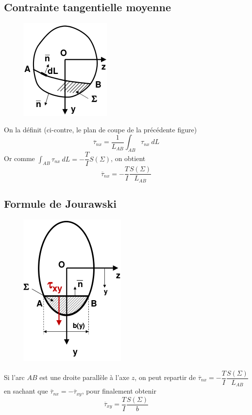 	\subsection{Contrainte tangentielle moyenne}
	\begin{figure}
	\vspace{-7mm}
	\includegraphics[scale=0.4]{ch5/image4.png}
	\end{figure}
	On la définit (ci-contre, le plan de coupe de la précédente figure)
	\begin{equation}
	\overline{\tau}_{nx} = \dfrac{1}{L_{AB}}\int_{AB}\tau_{nx}\ dL
	\end{equation}
	Or comme $\int_{AB} \tau_{nx}\ dL = -\dfrac{T}{I}S(\Sigma)$, on obtient 
	\begin{equation}
	\overline{\tau}_{nx} = -\dfrac{T}{I}\dfrac{S(\Sigma)}{L_{AB}}
	\end{equation}
	
	
	\subsection{Formule de Jourawski}
	\begin{figure}
	\vspace{-7mm}
	\includegraphics[scale=0.4]{ch5/image5.png}
	\end{figure}
	Si l'arc $AB$ est une droite parallèle à l'axe $z$, on peut repartir de 
	$\overline{\tau}_{nx} = -\dfrac{T}{I}\dfrac{S(\Sigma)}{L_{AB}}$ en sachant 
	que $\overline{\tau}_{nx} = -\overline{\tau}_{xy}$, pour finalement obtenir 
	\begin{equation}
	\overline{\tau}_{xy} = \dfrac{T}{I}\dfrac{S(\Sigma)}{b}
	\end{equation}
		
